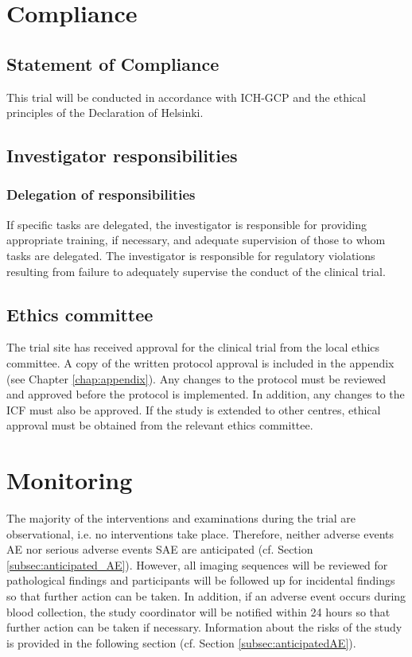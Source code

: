 \section{Compliance}
\subsection{Statement of Compliance}
This trial will be conducted in accordance with ICH-GCP and the ethical principles of the Declaration of Helsinki.

\subsection{Investigator responsibilities}

\subsubsection{Delegation of responsibilities}
If specific tasks are delegated, the investigator is responsible for providing appropriate training, if necessary, and adequate supervision of those to whom tasks are delegated. The investigator is responsible for regulatory violations resulting from failure to adequately supervise the conduct of the clinical trial.

\subsection{Ethics committee}
The trial site has received approval for the clinical trial from the local ethics committee. A copy of the written protocol approval is included in the appendix (see Chapter \ref{chap:appendix}). Any changes to the protocol must be reviewed and approved before the protocol is implemented. In addition, any changes to the \ac{ICF} must also be approved. If the study is extended to other centres, ethical approval must be obtained from the relevant ethics committee.

\section{Monitoring}
The majority of the interventions and examinations during the trial are observational, i.e. no interventions take place. Therefore, neither adverse events \ac{AE} nor serious adverse events \ac{SAE} are anticipated (cf. Section \ref{subsec:anticipated_AE}). However, all imaging sequences will be reviewed for pathological findings and participants will be followed up for incidental findings so that further action can be taken. In addition, if an adverse event occurs during blood collection, the study coordinator will be notified within 24 hours so that further action can be taken if necessary. Information about the risks of the study is provided in the following section (cf. Section \ref{subsec:anticipatedAE}).

